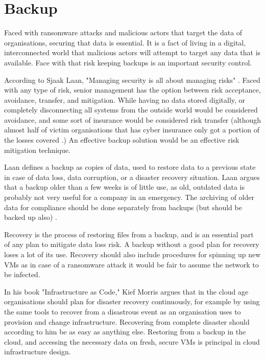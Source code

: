 \section{Backup} \label{Backup}
Faced with ransomware attacks and malicious actors that target the data of organisations, securing that data is essential. It is a fact of living in a digital, interconnected world that malicious actors will attempt to target any data that is available. Face with that risk keeping backups is an important security control.

According to Sjaak Laan, "Managing security is all about managing risks" \cite{laan_it_2017}. Faced with any type of risk, senior management has the option between risk acceptance, avoidance, transfer, and mitigation. While having no data stored digitally, or completely disconnecting all systems from the outside world would be considered avoidance, and some sort of insurance would be considered risk transfer (although almost half of victim organisations that has cyber insurance only got a portion of the losses covered \cite{noauthor_new_nodate}.) An effective backup solution would be an effective risk mitigation technique. 

Laan defines a backup as copies of data, used to restore data to a previous state in case of data loss, data corruption, or a disaster recovery situation. Laan argues that a backup older than a few weeks is of little use, as old, outdated data is probably not very useful for a company in an emergency. The archiving of older data for compliance should be done separately from backups (but should be backed up also) \cite{laan_it_2017}.

Recovery is the process of restoring files from a backup, and is an essential part of any plan to mitigate data loss risk. A backup without a good plan for recovery loses a lot of its use. Recovery should also include procedures for spinning up new VMs as in case of a ransomware attack it would be fair to assume the network to be infected.

In his book "Infrastructure as Code," Kief Morris \cite{morris_infrastructure_2020} argues that in the cloud age organisations should plan for disaster recovery continuously, for example by using the same tools to recover from a disastrous event as an organisation uses to provision and change infrastructure. Recovering from complete disaster should according to him be as easy as anything else. Restoring from a backup in the cloud, and accessing the necessary data on fresh, secure VMs is principal in cloud infrastructure design.

